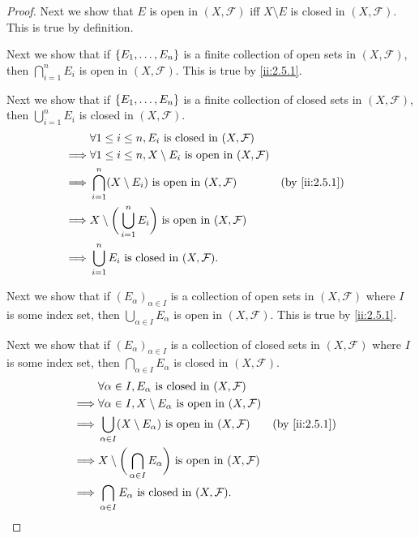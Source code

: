 \begin{proof}
  Next we show that \(E\) is open in \((X, \mathcal{F})\) iff \(X \setminus E\) is closed in \((X, \mathcal{F})\).
  This is true by definition.

  Next we show that if \(\left\lbrace E_1, \dots, E_n\right\rbrace\) is a finite collection of open sets in \((X, \mathcal{F})\), then \(\bigcap_{i = 1}^n E_i\) is open in \((X, \mathcal{F})\).
  This is true by \cref{ii:2.5.1}.

  Next we show that if \(\left\lbrace E_1, \dots, E_n\right\rbrace\) is a finite collection of closed sets in \((X, \mathcal{F})\), then \(\bigcup_{i = 1}^n E_i\) is closed in \((X, \mathcal{F})\).
  \begin{align*}
             & \forall 1 \leq i \leq n, E_i \text{ is closed in } (X, \mathcal{F})                                \\
    \implies & \forall 1 \leq i \leq n, X \setminus E_i \text{ is open in } (X, \mathcal{F})                      \\
    \implies & \bigcap_{i = 1}^n (X \setminus E_i) \text{ is open in } (X, \mathcal{F})           &  & \by{ii:2.5.1} \\
    \implies & X \setminus \bigg(\bigcup_{i = 1}^n E_i\bigg) \text{ is open in } (X, \mathcal{F})                 \\
    \implies & \bigcup_{i = 1}^n E_i \text{ is closed in } (X, \mathcal{F}).
  \end{align*}

  Next we show that if \((E_\alpha)_{\alpha \in I}\) is a collection of open sets in \((X, \mathcal{F})\) where \(I\) is some index set, then \(\bigcup_{\alpha \in I} E_\alpha\) is open in \((X, \mathcal{F})\).
  This is true by \cref{ii:2.5.1}.

  Next we show that if \((E_\alpha)_{\alpha \in I}\) is a collection of closed sets in \((X, \mathcal{F})\) where \(I\) is some index set, then \(\bigcap_{\alpha \in I} E_\alpha\) is closed in \((X, \mathcal{F})\).
  \begin{align*}
             & \forall \alpha \in I, E_\alpha \text{ is closed in } (X, \mathcal{F})                                        \\
    \implies & \forall \alpha \in I, X \setminus E_\alpha \text{ is open in } (X, \mathcal{F})                              \\
    \implies & \bigcup_{\alpha \in I} (X \setminus E_\alpha) \text{ is open in } (X, \mathcal{F})           &  & \by{ii:2.5.1} \\
    \implies & X \setminus \bigg(\bigcap_{\alpha \in I} E_\alpha\bigg) \text{ is open in } (X, \mathcal{F})                 \\
    \implies & \bigcap_{\alpha \in I} E_\alpha \text{ is closed in } (X, \mathcal{F}).
  \end{align*}


\end{proof}
